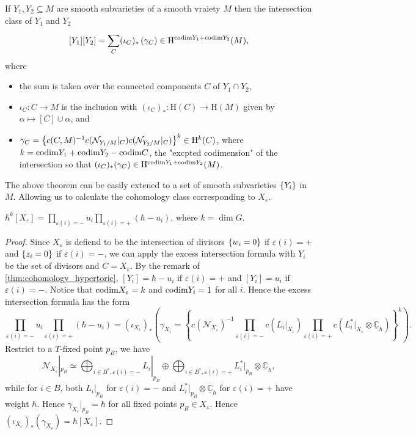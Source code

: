 \documentclass[b5paper]{article}
\newcommand{\HH}{\mathrm{H}}
\begin{document}
\begin{theorem}[thm:]{\cite[Theorem 13.3]{eisenbud20163264}}
    If $Y_1,Y_2\subseteq M$ are smooth subvarieties of a smooth vraiety $M$ then the intersection class of $Y_1$ and $Y_2$
    \[
        [Y_1][Y_2] = \sum_{C}^{}(\iota_C)_*\left(\gamma_C\right) \in \HH^{\codim Y_1+\codim Y_2}(M),
    \]
    where 
    \begin{itemize}
        \item the sum is taken over the connected components $C$ of $Y_1\cap Y_2$,
        \item $\iota_C:C\rightarrow M$ is the inclusion with $(\iota_C)_*:\HH(C)\rightarrow \HH(M)$ given by $\alpha\mapsto [C]\cup \alpha$, and
        \item $\gamma_C=\CB{c(C,M)^{-1}c(\mathcal{N}_{Y_1/M}|_{C})c(\mathcal{N}_{Y_2/M}|_{C})}^k\in \HH^k(C)$, where $k=\textnormal{codim} Y_1+\textnormal{codim} Y_2-\textnormal{codim} C$, the "excpted codimension" of the intersection so that $(\iota_C)_*(\gamma_C)\in \HH^{\codim Y_1+\codim Y_2}(M)$.
    \end{itemize}
\end{theorem}

The above theorem can be easily extened to a set of smooth subvarieties $\left\{Y_i\right\}$ in $M$. Allowing us to calculate the cohomology class corresponding to $X_\varepsilon$.

\begin{proposition}[pps:]{}
    $\hbar^k[X_{\varepsilon}]=\prod_{\varepsilon(i)=-}^{}u_i\prod_{\varepsilon(i)=+}^{}(\hbar-u_i)$, where $k=\dim G$.
    \begin{proof}
        Since $X_\varepsilon$ is defiend to be the intersection of divisors $\left\{w_i=0\right\}$ if $\varepsilon(i)=+$ and $\left\{z_i=0\right\}$ if $\varepsilon(i)=-$, we can apply the excess intersection formula with $Y_i$ be the set of divisors and $C=X_\varepsilon$. By the remark of \cref{thm:cohomology_hypertoric}, $[Y_i]=\hbar-u_i$ if $\varepsilon(i)=+$ and $[Y_i]=u_i$ if $\varepsilon(i)=-$. Notice that $\textnormal{codim} X_\varepsilon=k$ and $\textnormal{codim} Y_i=1$ for all $i$. Hence the excess intersection formula has the form
        \[
            \prod_{\varepsilon(i)=-}^{}u_i\prod_{\varepsilon(i)=+}^{}(\hbar-u_i)=(\iota_{X_{\varepsilon}})_*\left(\gamma_{X_\varepsilon}=\left\{c(\mathcal{N}_{X_\varepsilon})^{-1}\prod_{\varepsilon(i)=-}^{}c(L_i|_{X_\varepsilon})\prod_{\varepsilon(i)=+}^{}c(L_i^*|_{X_\varepsilon}\otimes\underline{\mathbb{C}}_\hbar)\right\}^k\right).
        \]
    Restrict to a $T$-fixed point $p_B$, we have 
    \[
        \mathcal{N}_{X_\varepsilon}|_{p_B}\simeq \bigoplus_{i\in B^*,\varepsilon(i)=-}L_i|_{p_B}\oplus\bigoplus _{i\in B^*,\varepsilon(i)=+}L_i^*|_{p_B}\otimes\underline{\mathbb{C}}_\hbar,
    \]
    while for $i\in B$, both $L_i|_{p_B}$ for $\varepsilon(i)=-$ and $L_i^*|_{p_B}\otimes\underline{\mathbb{C}}_\hbar$ for $\varepsilon(i)=+$ have weight $\hbar$. Hence $\gamma_{X_{\varepsilon}}|_{p_B}=\hbar$ for all fixed points $p_B\in X_{\varepsilon}$. Hence $(\iota_{X_\varepsilon})_*(\gamma_{X_\varepsilon})=\hbar[X_\varepsilon]$.
    \end{proof}
\end{proposition}
\end{document}
